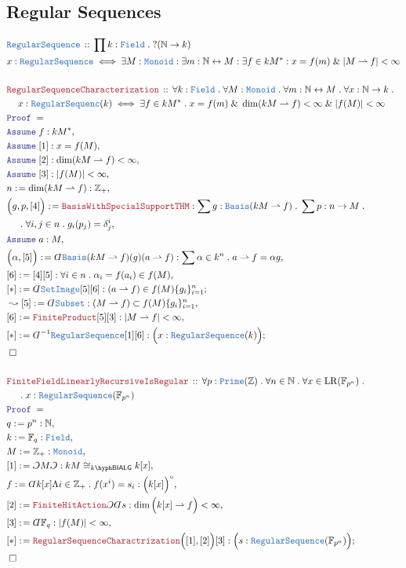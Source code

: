 \documentclass[12pt]{scrartcl}%
\newcommand{\TYPE}[1]{\textcolor{NavyBlue}{\mathtt{#1}}}%
\newcommand{\LOGIC}[1]{\textcolor{Blue}{\mathtt{#1}}}%
\newcommand{\THM}[1]{\textcolor{Maroon}{\mathtt{#1}}}%
\renewcommand{\.}{\; . \;} %
\newcommand{\de}{: \kern 0.1pc =} %
\newcommand{\Theorem}[2]{& \THM{#1} \, :: \, #2 \\ & \Proof = \\ } %
\newcommand{\DeclareType}[2]{& \TYPE{#1} \, :: \, #2 \\}%
\newcommand{\DefineType}[3]{& #1 : \TYPE{#2} \iff #3 \\}%
\newcommand{\NewLine}{\\ & \kern 1pc}%
\newcommand{\Page}[1]{ \begin{align*} #1 \end{align*}  }%
\newcommand{ \bd }{ \ByDef }%
\renewcommand{\And}{\; \& \;}%
\newcommand{\Int}{\mathbb{Z}}%
\newcommand{\Nat}{\mathbb{N}}%
\newcommand{\ToBij}{\leftrightarrow} %
\newcommand{\Say}[3]{& #1 \de #2 : #3, \\} %
\newcommand{\Conclude}[3]{& #1 \de #2 : #3; \\}%
\newcommand{\Derive}[3]{& \leadsto #1 \de #2 : #3, \\} %
\newcommand{\Assume}[2]{& \LOGIC{Assume} \; #1 : #2, \\} %
\newcommand{\QED}{\; \square} %
\newcommand{\EndProof}{& \QED \\} %
\newcommand{\ByDef}{\rotatebox[origin=c]{-180}{$D$}}%
\newcommand{\ByConstr}{\rotatebox[origin=c]{-180}{$C$}}%
\newcommand{\Proof}{\LOGIC{Proof} \; } %
\newcommand{\Basis}{\TYPE{Basis}} %
\newcommand{\Field}{\TYPE{Field}}
\newcommand{\hit}{\rightharpoonup}
\newcommand{\BIALG}[1]{#1\hyph\mathsf{BIALG}}%
\begin{document}
\subsection{Regular Sequences}
\Page{
	\DeclareType{RegularSequence}
	{  
		\prod k : \Field \.   ?(\Nat \to k)
	}
	\DefineType{x}{RegularSequence}
	{
		\exists M : \TYPE{Monoid} :
		\exists m : \Nat \ToBij M :
		\exists f \in kM^* :
		x = f(m) \And | M \hit f | < \infty
	}
	\\
	\Theorem{RegularSequenceCharacterization}{ 
		\forall k : \Field \. 
		\forall M : \TYPE{Monoid} \.
		\forall m : \Nat \ToBij M \.
		\forall x : \Nat \to k \. \NewLine
		x : \TYPE{RegularSequenc}(k) \iff
		\exists f \in kM^* \.
		x = f(m) \And  \dim (kM \hit f) < \infty \And |f(M)| < \infty
	}
	\Assume{f}{kM^*}
	\Assume{[1]}{x = f(M)}
	\Assume{[2]}{\dim (kM \hit f) < \infty}
	\Assume{[3]}{|f(M)| < \infty}
	\Say{n}{\dim (kM \hit f)}{\Int_+}
	\Say{\Big(g,p,[4]\Big)}{\THM{BasisWithSpecialSupportTHM}}{
		\sum g : \TYPE{Basis}(kM \hit f) \. 
		\sum p : n \to M \. \NewLine \.  
		\forall i,j \in n \. g_i(p_j) = \delta^i_j
	}
	\Assume{a}{M}
	\Say{\Big( \alpha, [5] \Big)}{\bd \Basis(kM \hit f)(g)(a \hit f)}
	{\sum \alpha \in  k^n \. a \hit f = \alpha g}
	\Say{[6]}{[4][5]}{  \forall i \in n \.  \alpha_i =  f( a_i ) \in f(M)    }
	\Conclude{[*]}{\bd \TYPE{SetImage}[5][6]}{(a \hit f) \in f(M)\{g_i\}^n_{i=1}}
	\Derive{[5]}{\bd \TYPE{Subset}}{ (M \hit f) \subset f(M)\{g_i\}^n_{i=1}  }
	\Say{[6]}{ \THM{FiniteProduct}[5][3]}{  | M \hit f | < \infty    }
	\Conclude{[*]}{\bd^{-1} \TYPE{RegularSequence}[1][6]}{ \Big(x : \TYPE{RegularSequence}(k) \Big)   }
	\EndProof
	\\
	\Theorem{FiniteFieldLinearlyRecursiveIsRegular}
	{
		\forall p : \TYPE{Prime}(\Int) \.
		\forall n \in \Nat \. 
		\forall x \in \mathrm{LR}(\mathbb{F}_{p^n}) \. \NewLine \. 
		x : \TYPE{RegularSequence}(\mathbb{F}_{p^n}) 
	}
	\Say{q}{p^n}{\Nat}
	\Say{k}{\mathbb{F}_q}{\Field}
	\Say{M}{\Int_+}{\TYPE{Monoid}}
	\Say{[1]}{\ByConstr M \ByConstr}{kM \cong_{\BIALG{k}} k[x]}
	\Say{f}{\bd k[x] \Lambda i \in \Int_+ \. f(x^i) = s_i }{\Big(k[x]\Big)^\circ}
	\Say{[2]}{\THM{FiniteHitAction}\ByConstr \bd s}{\dim \Big(k[x] \hit f\Big) < \infty }
	\Say{[3]}{\bd \mathbb{F}_q}{|f(M)| < \infty}
	\Conclude{[*]}{ \THM{RegularSequenceCharactrization}\Big( [1],[2] \Big)[3]}
	{\Big(s : \TYPE{RegularSequence}(\mathbb{F}_{p^n}) \Big)}
	\EndProof
}
\newpage
\end{document}
